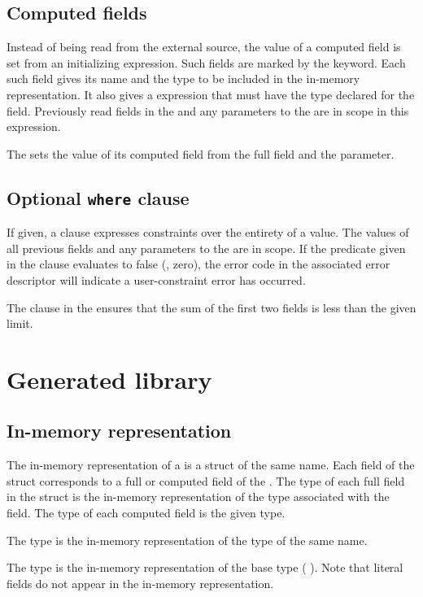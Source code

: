 \subsection{Computed fields}
Instead of being read from the external source, the value of a
computed field is set from an initializing expression.  Such fields
are marked by the \compute{} keyword.  Each such field gives its name
and the \C{} type to be included in the in-memory representation.  It
also gives a \C{} expression that must have the type declared for the
field.  Previously read fields in the \struct{} and any parameters
to the  are in scope in this expression.

The  \struct{} sets the value of its computed
field  from the full field  and the 
parameter. 



\subsection{Optional \texttt{where} clause}
If given, a \where{} clause expresses constraints over the entirety
of a \struct{} value.  The values of all previous fields and any
parameters to the \struct{} are in scope.  If the predicate given in
the \where{} clause evaluates to false (\ie{}, zero), the error code
in the associated error descriptor will indicate a user-constraint
error has occurred.  

The \where{} clause in the  \struct{} ensures
that the sum of the first two fields is less than the given limit.


\section{Generated library}
\subsection{In-memory representation}
The in-memory representation of a \struct{} is a \C{} struct of the
same name.  Each field of the \C{} struct corresponds to a full or
computed field of the \struct{}.  The type of each full field in
the \C{} struct is the in-memory representation of the \padsl{} type
associated with the field.  The type of each computed field is 
the given \C{} type. 

The \C{} type  is the in-memory representation of
the \padsl{} type of the same name.

The type  is the in-memory representation of the base
type  (\cf{} ).  Note that literal fields
do not appear in the in-memory representation. 


